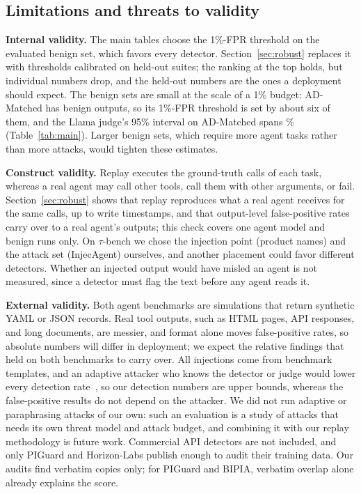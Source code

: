 \subsection{Limitations and threats to validity}
\label{sec:limitations}

\noindent\textbf{Internal validity.} The main tables choose the 1\%-FPR threshold on the evaluated benign set, which favors every detector. Section~\ref{sec:robust} replaces it with thresholds calibrated on held-out suites; the ranking at the top holds, but individual numbers drop, and the held-out numbers are the ones a deployment should expect. The benign sets are small at the scale of a 1\% budget: AD-Matched has \NADBenign benign outputs, so its 1\%-FPR threshold is set by about six of them, and the Llama judge's 95\% interval on AD-Matched spans \ADJLTprCI\% (Table~\ref{tab:main}). Larger benign sets, which require more agent tasks rather than more attacks, would tighten these estimates.

\noindent\textbf{Construct validity.} Replay executes the ground-truth calls of each task, whereas a real agent may call other tools, call them with other arguments, or fail. Section~\ref{sec:robust} shows that replay reproduces what a real agent receives for the same calls, up to write timestamps, and that output-level false-positive rates carry over to a real agent's outputs; this check covers one agent model and benign runs only. On $\tau$-bench we chose the injection point (product names) and the attack set (InjecAgent) ourselves, and another placement could favor different detectors. Whether an injected output would have misled an agent is not measured, since a detector must flag the text before any agent reads it.

\noindent\textbf{External validity.} Both agent benchmarks are simulations that return synthetic YAML or JSON records. Real tool outputs, such as HTML pages, API responses, and long documents, are messier, and format alone moves false-positive rates, so absolute numbers will differ in deployment; we expect the relative findings that held on both benchmarks to carry over. All injections come from benchmark templates, and an adaptive attacker who knows the detector or judge would lower every detection rate~\cite{attackermovessecond,zhan2025adaptive,hackett2025}, so our detection numbers are upper bounds, whereas the false-positive results do not depend on the attacker. We did not run adaptive or paraphrasing attacks of our own: such an evaluation is a study of attacks that needs its own threat model and attack budget, and combining it with our replay methodology is future work. Commercial API detectors are not included, and only PIGuard and Horizon-Labs publish enough to audit their training data. Our audits find verbatim copies only; for PIGuard and BIPIA, verbatim overlap alone already explains the score.

